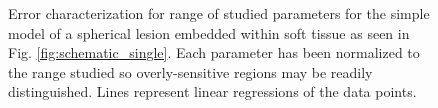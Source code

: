 \begin{figure}[!htb]
				\caption[Error characterization for a hard spherical lesion]{Error characterization for range of studied parameters for the simple model of a spherical lesion embedded within soft tissue as seen in Fig. \ref{fig:schematic_single}. Each parameter has been normalized to the range studied so overly-sensitive regions may be readily distinguished. Lines represent linear regressions of the data points.}
				\label{fig:normalized_characterization}
			\end{figure}

